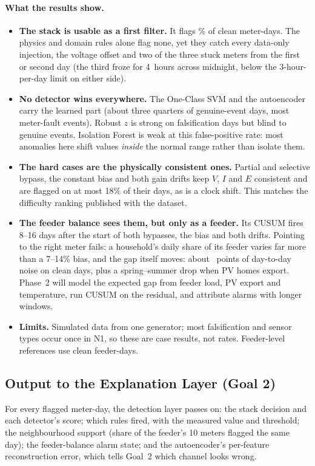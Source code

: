 \documentclass[11pt,a4paper]{article}
\begin{document}
\paragraph{What the results show.}
\begin{itemize}[leftmargin=*,itemsep=2pt]
  \item \textbf{The stack is usable as a first filter.} It flags \stackFPR\% of clean meter-days. The physics
        and domain rules alone flag none, yet they catch every data-only injection, the voltage offset and two of
        the three stuck meters from the first or second day (the third froze for 4~hours across midnight,
        below the 3-hour-per-day limit on either side).
  \item \textbf{No detector wins everywhere.} The One-Class SVM and the autoencoder carry the learned part
        (about three quarters of genuine-event days, most meter-fault events). Robust $z$ is strong on
        falsification days but blind to genuine events. Isolation Forest is weak at this false-positive rate:
        most anomalies here shift values \emph{inside} the normal range rather than isolate them.
  \item \textbf{The hard cases are the physically consistent ones.} Partial and selective bypass, the
        constant bias and both gain drifts keep $V$, $I$ and $E$ consistent and are flagged on at most 18\% of
        their days, as is a clock shift. This matches the difficulty ranking published with the dataset.
  \item \textbf{The feeder balance sees them, but only as a feeder.} Its CUSUM fires 8--16 days after the start
        of both bypasses, the bias and both drifts. Pointing to the right meter fails: a household's daily
        share of its feeder varies far more than a 7--14\% bias, and the gap itself moves: about \gapSd{}~points of
        day-to-day noise on clean days, plus a spring--summer drop when PV homes export. Phase~2 will model
        the expected gap from feeder load, PV export and temperature, run CUSUM on the residual, and attribute
        alarms with longer windows.
  \item \textbf{Limits.} Simulated data from one generator; most falsification and sensor types occur once in
        N1, so these are case results, not rates. Feeder-level references use clean feeder-days.
\end{itemize}

\subsection{Output to the Explanation Layer (Goal 2)}
For every flagged meter-day, the detection layer passes on: the stack decision and each detector's score; which rules
fired, with the measured value and threshold; the neighbourhood support (share of the feeder's 10 meters flagged
the same day); the feeder-balance alarm state; and the autoencoder's per-feature reconstruction error, which
tells Goal~2 which channel looks wrong.
\end{document}
